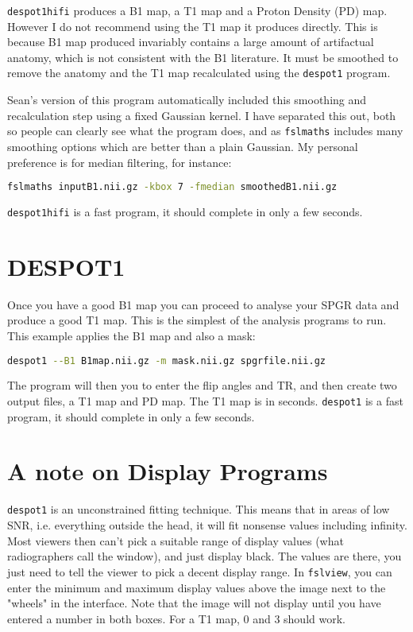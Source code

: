 \documentclass{report}
\begin{document}
\texttt{despot1hifi} produces a B1 map, a T1 map and a Proton Density (PD) map. However I do not recommend using the T1 map it produces directly. This is because B1 map produced invariably contains a large amount of artifactual anatomy, which is not consistent with the B1 literature. It must be smoothed to remove the anatomy and the T1 map recalculated using the \texttt{despot1} program.

Sean's version of this program automatically included this smoothing and recalculation step using a fixed Gaussian kernel. I have separated this out, both so people can clearly see what the program does, and as \texttt{fslmaths} includes many smoothing options which are better than a plain Gaussian. My personal preference is for median filtering, for instance:

\begin{lstlisting}[language=sh]
fslmaths inputB1.nii.gz -kbox 7 -fmedian smoothedB1.nii.gz
\end{lstlisting}

\texttt{despot1hifi} is a fast program, it should complete in only a few seconds.

\section{DESPOT1}

Once you have a good B1 map you can proceed to analyse your SPGR data and produce a good T1 map. This is the simplest of the analysis programs to run. This example applies the B1 map and also a mask:

\begin{lstlisting}[language=sh]
despot1 --B1 B1map.nii.gz -m mask.nii.gz spgrfile.nii.gz
\end{lstlisting}

The program will then you to enter the flip angles and TR, and then create two output files, a T1 map and PD map. The T1 map is in seconds. \texttt{despot1} is a fast program, it should complete in only a few seconds.

\section{A note on Display Programs}

\texttt{despot1} is an unconstrained fitting technique. This means that in areas of low SNR, i.e. everything outside the head, it will fit nonsense values including infinity. Most viewers then can't pick a suitable range of display values (what radiographers call the window), and just display black. The values are there, you just need to tell the viewer to pick a decent display range. In \texttt{fslview}, you can enter the minimum and maximum display values above the image next to the "wheels" in the interface. Note that the image will not display until you have entered a number in both boxes. For a T1 map, 0 and 3 should work.
\end{document}
